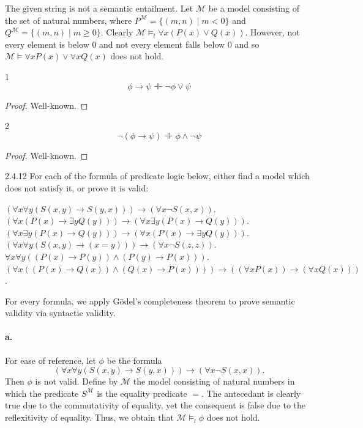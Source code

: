 \documentclass{exam}
\begin{document}
The given string is not a semantic entailment. Let $\mathcal M$ be a model consisting of the set of natural numbers, where $P^{\mathcal M} = \{(m, n) \mid m < 0\}$ and $Q^{\mathcal M} = \{(m, n) \mid m \ge 0\}$. Clearly $\mathcal M \vDash_l \forall x (P(x) \lor Q(x))$. However, not every element is below $0$ and not every element falls below 0 and so $\mathcal M \vDash \forall x P(x) \lor \forall x Q(x)$ does not hold.

\begin{lemma}{1}
	\[
		\phi \rightarrow \psi \dashVdash \lnot \phi \lor \psi
	\]
\end{lemma}
\begin{proof}
	Well-known.
\end{proof}

\begin{lemma}{2}
	\[
		\lnot(\phi \rightarrow \psi) \dashVdash \phi \land \lnot\psi
	\]
\end{lemma}
\begin{proof}
	Well-known.
\end{proof}

\begin{problem}{2.4.12}
	For each of the formula of predicate logic below, either find a model which does not satisfy it, or prove it is valid:
	\begin{tasks}[label=\textbf{\alph*.}]
		\task[\textbf{a.}] $(\forall x \forall y (S(x, y) \rightarrow S(y, x))) \rightarrow (\forall x \lnot S(x, x))$.
		\task[\textbf{c.}] $(\forall x (P(x) \rightarrow \exists y Q(y))) \rightarrow (\forall x \exists y (P(x) \rightarrow Q(y)))$.
		\task[\textbf{d.}] $(\forall x \exists y (P(x) \rightarrow Q(y))) \rightarrow (\forall x (P(x) \rightarrow \exists y Q(y)))$.
		\task[\textbf{f.}] $(\forall x \forall y (S(x, y) \rightarrow (x = y))) \rightarrow (\forall x \lnot S(z, z))$.
		\task[\textbf{h.}] $\forall x \forall y ((P(x) \rightarrow P(y)) \land (P(y) \rightarrow P(x)))$.
		\task[\textbf{i.}] $(\forall x ((P(x) \rightarrow Q(x)) \land (Q(x) \rightarrow P(x)))) \rightarrow ((\forall x P(x)) \rightarrow (\forall x Q(x)))$.
	\end{tasks}
\end{problem}

For every formula, we apply Gödel's completeness theorem to prove semantic validity via syntactic validity.
\paragraph{a.} For ease of reference, let $\phi$ be the formula
\[
	(\forall x \forall y (S(x, y) \rightarrow S(y, x))) \rightarrow (\forall x \lnot S(x, x)).
\]
Then $\phi$ is not valid. Define by $\mathcal M$ the model consisting of natural numbers in which the predicate $S^{\mathcal M}$ is the equality predicate $=$. The antecedant is clearly true due to the commutativity of equality, yet the consequent is false due to the reflexitivity of equality. Thus, we obtain that $\mathcal M \vDash_l \phi$ does not hold.
\end{document}
